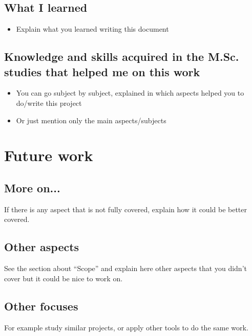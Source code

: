 \documentclass[a4paper, 12pt]{book}
\begin{document}
\subsection{What I learned}
\begin{itemize}
 \item Explain what you learned writing this document
\end{itemize}

\subsection{Knowledge and skills acquired in the M.Sc. studies that helped me on
this work}
\begin{itemize}
 \item You can go subject by subject, explained in which aspects helped
you to do/write this project
 \item Or just mention only the main aspects/subjects

\end{itemize}

\section{Future work}
\label{sec:future}

\subsection{More on...}

If there is any aspect that is not fully covered, explain how it could be
better covered.

\subsection{Other aspects}

See the section about ``Scope'' and explain here other aspects that you didn't
cover but it could be nice to work on.


\subsection{Other focuses}

For example study similar projects, or apply other tools to do the same work.

\appendix

\end{document}
